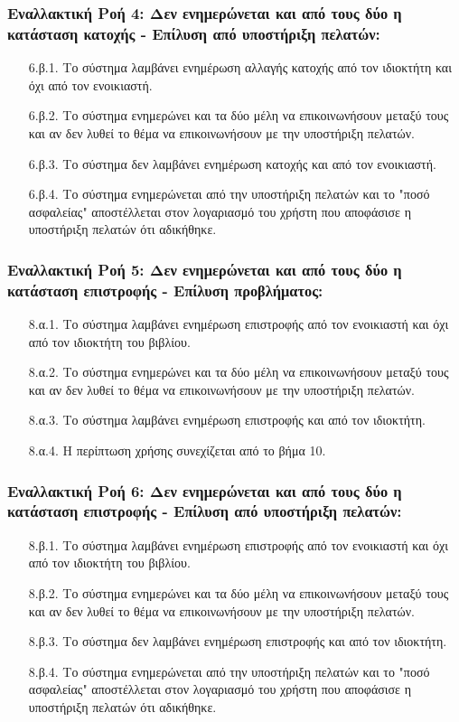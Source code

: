 \documentclass[12pt,a4paper]{article}
\begin{document}
\subsubsection*{Εναλλακτική Ροή 4: Δεν ενημερώνεται και από τους δύο η κατάσταση κατοχής - Επίλυση από υποστήριξη πελατών:}
\begin{enumerate}
    \item[6.β.1.] Το σύστημα λαμβάνει ενημέρωση αλλαγής κατοχής από τον ιδιοκτήτη και όχι από τον ενοικιαστή.
    \item[6.β.2.] Το σύστημα ενημερώνει και τα δύο μέλη να επικοινωνήσουν μεταξύ τους και αν δεν λυθεί το θέμα να επικοινωνήσουν με την υποστήριξη πελατών.
    \item[6.β.3.] Το σύστημα δεν λαμβάνει ενημέρωση κατοχής και από τον ενοικιαστή.
    \item[6.β.4.] Το σύστημα ενημερώνεται από την υποστήριξη πελατών και το "ποσό ασφαλείας" αποστέλλεται στον λογαριασμό του χρήστη που αποφάσισε η υποστήριξη πελατών ότι αδικήθηκε.
\end{enumerate}

\subsubsection*{Εναλλακτική Ροή 5: Δεν ενημερώνεται και από τους δύο η κατάσταση επιστροφής - Επίλυση προβλήματος:}
\begin{enumerate}
    \item[8.α.1.] Το σύστημα λαμβάνει ενημέρωση επιστροφής από τον ενοικιαστή και όχι από τον ιδιοκτήτη του βιβλίου.
    \item[8.α.2.] Το σύστημα ενημερώνει και τα δύο μέλη να επικοινωνήσουν μεταξύ τους και αν δεν λυθεί το θέμα να επικοινωνήσουν με την υποστήριξη πελατών.
    \item[8.α.3.] Το σύστημα λαμβάνει ενημέρωση επιστροφής και από τον ιδιοκτήτη.
    \item[8.α.4.] Η περίπτωση χρήσης συνεχίζεται από το βήμα 10.
\end{enumerate}

\subsubsection*{Εναλλακτική Ροή 6: Δεν ενημερώνεται και από τους δύο η κατάσταση επιστροφής - Επίλυση από υποστήριξη πελατών:}
\begin{enumerate}
    \item[8.β.1.] Το σύστημα λαμβάνει ενημέρωση επιστροφής από τον ενοικιαστή και όχι από τον ιδιοκτήτη του βιβλίου.
    \item[8.β.2.] Το σύστημα ενημερώνει και τα δύο μέλη να επικοινωνήσουν μεταξύ τους και αν δεν λυθεί το θέμα να επικοινωνήσουν με την υποστήριξη πελατών.
    \item[8.β.3.] Το σύστημα δεν λαμβάνει ενημέρωση επιστροφής και από τον ιδιοκτήτη.
    \item[8.β.4.] Το σύστημα ενημερώνεται από την υποστήριξη πελατών και το "ποσό ασφαλείας" αποστέλλεται στον λογαριασμό του χρήστη που αποφάσισε η υποστήριξη πελατών ότι αδικήθηκε.
\end{enumerate}
\end{document}
